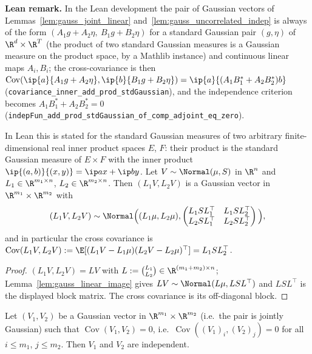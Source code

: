 \textbf{Lean remark.} In the Lean development the pair of Gaussian vectors of
Lemmas~\ref{lem:gauss_joint_linear} and~\ref{lem:gauss_uncorrelated_indep} is always of the
form $(A_1g + A_2\eta,\ B_1g + B_2\eta)$ for a standard Gaussian pair $(g,\eta)$ of
$\R^{d}\times\R^{T}$ (the product of two standard Gaussian measures is a Gaussian measure on
the product space, by a Mathlib instance) and continuous linear maps
$A_i, B_i$; the cross-covariance is then
$\operatorname{Cov}(\ip{a}{A_1g+A_2\eta}, \ip{b}{B_1g+B_2\eta}) = \ip{a}{(A_1B_1^* + A_2B_2^*)b}$
(\texttt{covariance\_inner\_add\_prod\_stdGaussian}), and the independence criterion becomes
$A_1B_1^* + A_2B_2^* = 0$
(\texttt{indepFun\_add\_prod\_stdGaussian\_of\_comp\_adjoint\_eq\_zero}).

\begin{lemma}\label{lem:gauss_joint_linear}
\leanok
In Lean this is stated for the standard Gaussian measures of two arbitrary
finite-dimensional real inner product spaces $E$, $F$: their product is the standard Gaussian
measure of $E \times F$ with the inner product $\ip{(a,b)}{(x,y)} = \ip a x + \ip b y$.
Let $V \sim \Normal(\mu,S)$ in $\R^n$ and $L_1 \in \R^{m_1\times n}$, $L_2 \in \R^{m_2\times n}$.
Then $(L_1 V, L_2 V)$ is a Gaussian vector in $\R^{m_1}\times\R^{m_2}$ with
\[
  (L_1V, L_2V) \sim \Normal\Big( (L_1\mu, L_2\mu),
  \begin{pmatrix} L_1SL_1^\top & L_1SL_2^\top \\ L_2SL_1^\top & L_2SL_2^\top\end{pmatrix}\Big),
\]
and in particular the cross covariance is
$\operatorname{Cov}(L_1V, L_2V) := \E[(L_1V - L_1\mu)(L_2V - L_2\mu)^\top] = L_1 S L_2^\top$.
\end{lemma}

\begin{proof}
\leanok
{}
$(L_1V, L_2V) = LV$ with $L := \binom{L_1}{L_2} \in \R^{(m_1+m_2)\times n}$;
Lemma~\ref{lem:gauss_linear_image} gives $LV \sim \Normal(L\mu, LSL^\top)$ and
$LSL^\top$ is the displayed block matrix. The cross covariance is its off-diagonal block.
\end{proof}

\begin{lemma}\label{lem:gauss_uncorrelated_indep}
\leanok
{}
Let $(V_1, V_2)$ be a Gaussian vector in $\R^{m_1}\times\R^{m_2}$ (i.e.\ the pair is jointly
Gaussian) such that $\operatorname{Cov}(V_1, V_2) = 0$, i.e.\
$\operatorname{Cov}((V_1)_i, (V_2)_j) = 0$ for all $i \le m_1$, $j \le m_2$. Then $V_1$ and
$V_2$ are independent.
\end{lemma}

